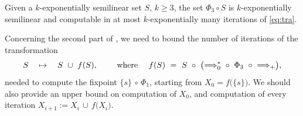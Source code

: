 \begin{claim}\label{claim:sl4}
  Given a $k$-exponentially semilinear set $S$, $k\geq 3$, 
  the set $\Phi_3 \circ S$ is 
  $k$-exponentially semilinear and computable in
  at most $k$-exponentially many iterations of \eqref{eq:tra}.
\end{claim}


Concerning the second part of ,
we need to bound the number of iterations 
of the transformation
\begin{align}\label{eq:tra2}
S \quad \mapsto \quad S \ \cup \ f(S),
\qquad \text{ where } \quad
f(S) \ = \ S \ 
    \circ \ \bigl({\stepp{0}^*} \ \circ \ \Phi_3 \ \circ \ {\stepp +}\bigr),
\end{align}
needed to compute the
fixpoint $\{s\} \,\circ\, \Phi_1$, starting from
$X_0 =  f\bigl(\{s\}\bigr)$. 
We should also provide an upper bound on computation of $X_0$,
and computation of every iteration
$
X_{i+1}  :=  X_i  \,\cup\, f\bigl(X_i\bigr).
$

\medskip


